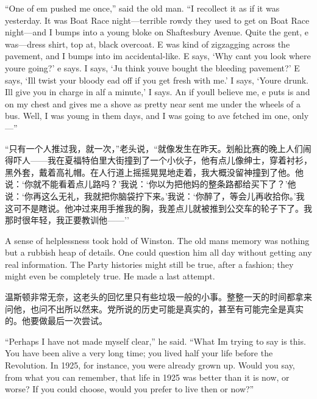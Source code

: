 \begin{paracol}{2}
\switchcolumn*

``One of em pushed me once,'' said the old man. ``I recollect it as if it
was yesterday. It was Boat Race night---terrible rowdy they used to get
on Boat Race night---and I bumps into a young bloke on Shaftesbury
Avenue. Quite the gent, \textquotesingle e was---dress shirt, top
\textquotesingle at, black overcoat. \textquotesingle E was kind of
zigzagging across the pavement, and I bumps into \textquotesingle im
accidental-like. \textquotesingle E says, `Why
can\textquotesingle t you look where you\textquotesingle re
going?' \textquotesingle e says. I says,
`Ju think you\textquotesingle ve bought the bleeding
pavement?' \textquotesingle E says,
`I\textquotesingle ll twist your bloody
\textquotesingle ead off if you get fresh with me.' I
says, `You\textquotesingle re drunk.
I\textquotesingle ll give you in charge in \textquotesingle alf a
minute,' I says. \textquotesingle An if
you\textquotesingle ll believe me, \textquotesingle e puts
\textquotesingle is \textquotesingle and on my chest and gives me a
shove as pretty near sent me under the wheels of a bus. Well, I was
young in them days, and I was going to \textquotesingle ave fetched
\textquotesingle im one, only---''

\switchcolumn

``只有一个人推过我，就一次，''老头说，``就像发生在昨天。划船比赛的晚上人们闹得吓人——我在夏福特伯里大街撞到了一个小伙子，他有点儿像绅士，穿着衬衫，黑外套，戴着高礼帽。在人行道上摇摇晃晃地走着，我大概没留神撞到了他。他说：`你就不能看着点儿路吗？'我说：`你以为把他妈的整条路都给买下了？'他说：`你再这么无礼，我就把你脑袋拧下来。'我说：`你醉了，等会儿再收拾你。'我这可不是瞎说。他冲过来用手推我的胸，我差点儿就被推到公交车的轮子下了。我那时很年轻，我正要教训他——''

\switchcolumn*

A sense of helplessness took hold of Winston. The old
man\textquotesingle s memory was nothing but a rubbish heap of details.
One could question him all day without getting any real information. The
Party histories might still be true, after a fashion; they might even be
completely true. He made a last attempt.

\switchcolumn

温斯顿非常无奈，这老头的回忆里只有些垃圾一般的小事。整整一天的时间都拿来问他，也问不出所以然来。党所说的历史可能是真实的，甚至有可能完全是真实的。他要做最后一次尝试。

\switchcolumn*

``Perhaps I have not made myself clear,'' he said. ``What
I\textquotesingle m trying to say is this. You have been alive a very
long time; you lived half your life before the Revolution. In 1925, for
instance, you were already grown up. Would you say, from what you can
remember, that life in 1925 was better than it is now, or worse? If you
could choose, would you prefer to live then or now?''


\end{paracol}
